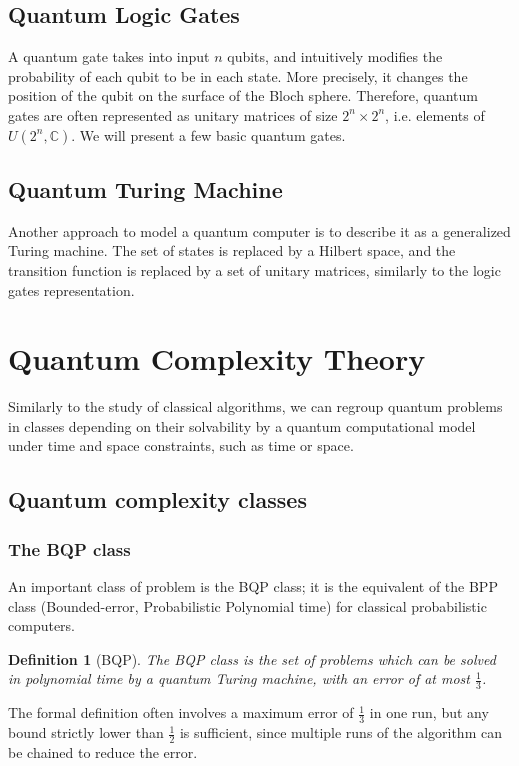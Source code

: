 \documentclass[12pt,a4paper]{article}
\newtheorem{definition}{Definition}
\begin{document}
\subsection{Quantum Logic Gates}
A quantum gate takes into input $n$ qubits, and intuitively modifies the probability of each qubit to be in each state. More precisely, it changes the position of the qubit on the surface of the Bloch sphere. Therefore, quantum gates are often represented as unitary matrices of size $2^n \times 2^n$, i.e. elements of $U(2^n, \mathbb{C})$. We will present a few basic quantum gates.

\subsection{Quantum Turing Machine}
Another approach to model a quantum computer is to describe it as a generalized Turing machine. The set of states is replaced by a Hilbert space, and the transition function is replaced by a set of unitary matrices, similarly to the logic gates representation. 

\section{Quantum Complexity Theory}
Similarly to the study of classical algorithms, we can regroup quantum problems in classes depending on their solvability by a quantum computational model under time and space constraints, such as time or space. 

\subsection{Quantum complexity classes}
\subsubsection{The BQP class}
An important class of problem is the BQP class; it is the equivalent of the BPP class (Bounded-error, Probabilistic Polynomial time) for classical probabilistic computers.

\begin{definition}[BQP] 
    The BQP class is the set of problems which can be solved in polynomial time by a quantum Turing machine, with an error of at most $\frac{1}{3}$. 
\end{definition}
The formal definition often involves a maximum error of $\frac{1}{3}$ in one run, but any bound strictly lower than $\frac{1}{2}$ is sufficient, since multiple runs of the algorithm can be chained to reduce the error.
\end{document}
